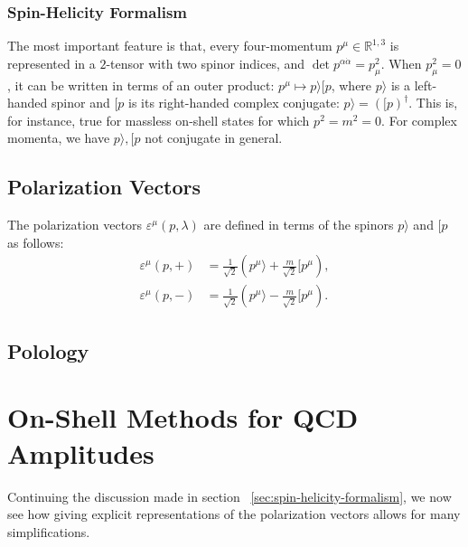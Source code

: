 \subsubsection{Spin-Helicity Formalism}

The most important feature is that, every four-momentum $p^\mu \in \mathbb{R}^{1,3}$ is represented in a $2$-tensor with two spinor indices, and $\operatorname{det } p^{\alpha \dot{\alpha}} = p_\mu^2$. When $p_{\mu}^2 = 0$, it can be written in terms of an outer product:
$p^\mu \mapsto p \rangle  [p $, where $p \rangle$ is a left-handed spinor and $[p$ is its right-handed complex conjugate:  $p \rangle = \left( [p \right) ^\dag$. This is, for instance, true for massless on-shell states for which $p^2 = m^2 = 0$.
For complex momenta, we have $p \rangle, [p$ not conjugate in general.

\subsection{Polarization Vectors}

The polarization vectors $\varepsilon^\mu(p, \lambda)$ are defined in terms of the spinors $p \rangle$ and $[p$ as follows:
\begin{align}
    \varepsilon^\mu(p, +) &= \frac{1}{\sqrt{2}} \left( p^\mu \rangle + \frac{m}{\sqrt{2}} [p^\mu \right), \\
    \varepsilon^\mu(p, -) &= \frac{1}{\sqrt{2}} \left( p^\mu \rangle - \frac{m}{\sqrt{2}} [p^\mu \right).
\end{align}




\subsection{Polology}
\label{sec:polology}


\section{On-Shell Methods for QCD Amplitudes}
\label{sec:on-shell-methods-qcd-amplitudes}

Continuing the discussion made in section~
\ref{sec:spin-helicity-formalism}, we now see how giving explicit representations of the polarization vectors allows for many simplifications.

